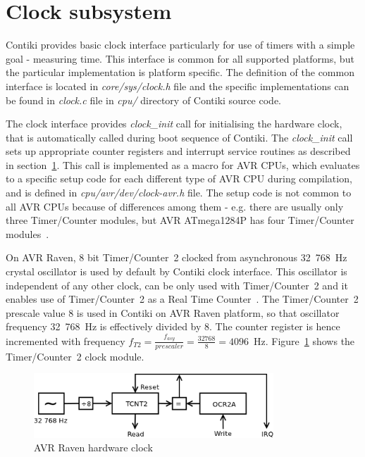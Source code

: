 
\section{Clock subsystem}\label{sec:analysis-clock}
Contiki provides basic clock interface particularly for use of timers
with a simple goal - measuring time.
This interface is common for all supported platforms,
but the particular implementation is platform specific.
The definition of the common interface is located in {\it{core/sys/clock.h}} file
and the specific implementations can be found in {\it{clock.c}} file
in {\it{cpu/}} directory of Contiki source code.

The clock interface provides {\it{clock\_init}} call for initialising the hardware clock,
that is automatically called during boot sequence of Contiki.
The {\it{clock\_init}} call sets up
appropriate counter registers and interrupt service routines as described in section~\ref{sec:analysis-clock}.
This call is implemented as a macro for AVR CPUs, which evaluates to a specific setup code for each
different type of AVR CPU during compilation, and is defined in {\it{cpu/avr/dev/clock-avr.h}} file.
The setup code is not common to all AVR CPUs because of differences among them - e.g. there are usually
only three Timer/Counter modules, but AVR ATmega1284P has four Timer/Counter modules~\cite{avr-datasheet}.

On AVR Raven, 8 bit Timer/Counter~2 clocked from asynchronous 32~768~Hz crystal oscillator
is used by default by Contiki clock interface.
This oscillator is independent of any other clock,
can be only used with Timer/Counter~2 and it
enables use of Timer/Counter~2 as a Real Time Counter~\cite{avr-datasheet}.
The Timer/Counter~2 prescale value 8 is used in Contiki on AVR Raven platform,
so that oscillator frequency 32~768~Hz is effectively divided by 8.
The counter register is hence incremented with frequency
$f_{T2} = {\frac{f_{asy}}{prescaler}} = {\frac{32768}{8}} = 4096$~Hz.
Figure~\ref{fig:avr-clock} shows the Timer/Counter~2 clock module.
\begin{figure}
  \centering
  \includegraphics[width=9cm,keepaspectratio]{fig/avr-clock.png}
  \caption{AVR Raven hardware clock}
  \label{fig:avr-clock}
\end{figure}

